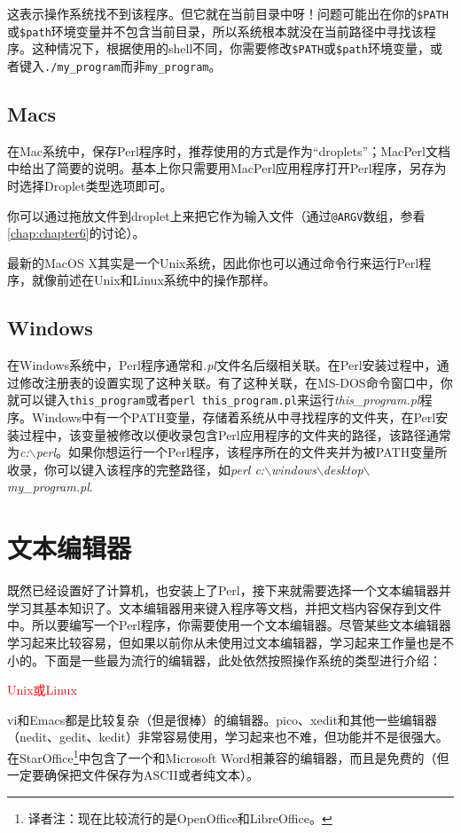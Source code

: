 这表示操作系统找不到该程序。但它就在当前目录中呀！问题可能出在你的\verb|$PATH|或\verb|$path|环境变量并不包含当前目录，所以系统根本就没在当前路径中寻找该程序。这种情况下，根据使用的shell不同，你需要修改\verb|$PATH|或\verb|$path|环境变量，或者键入\verb|./my_program|而非\verb|my_program|。

\subsection{Macs}
在Mac系统中，保存Perl程序时，推荐使用的方式是作为“droplets”；MacPerl文档中给出了简要的说明。基本上你只需要用MacPerl应用程序打开Perl程序，另存为时选择Droplet类型选项即可。

你可以通过拖放文件到droplet上来把它作为输入文件（通过\verb|@ARGV|数组，参看\autoref{chap:chapter6}的讨论）。

最新的MacOS X其实是一个Unix系统，因此你也可以通过命令行来运行Perl程序，就像前述在Unix和Linux系统中的操作那样。

\subsection{Windows}
在Windows系统中，Perl程序通常和\textit{.pl}文件名后缀相关联。在Perl安装过程中，通过修改注册表的设置实现了这种关联。有了这种关联，在MS-DOS命令窗口中，你就可以键入\verb|this_program|或者\verb|perl this_program.pl|来运行\textit{this\_program.pl}程序。Windows中有一个PATH变量，存储着系统从中寻找程序的文件夹，在Perl安装过程中，该变量被修改以便收录包含Perl应用程序的文件夹的路径，该路径通常为\textit{c:$\backslash$perl}。如果你想运行一个Perl程序，该程序所在的文件夹并为被PATH变量所收录，你可以键入该程序的完整路径，如\textit{perl c:$\backslash$windows$\backslash$desktop$\backslash$my\_program.pl}.

\section{文本编辑器}
既然已经设置好了计算机，也安装上了Perl，接下来就需要选择一个文本编辑器并学习其基本知识了。文本编辑器用来键入程序等文档，并把文档内容保存到文件中。所以要编写一个Perl程序，你需要使用一个文本编辑器。尽管某些文本编辑器学习起来比较容易，但如果以前你从未使用过文本编辑器，学习起来工作量也是不小的。下面是一些最为流行的编辑器，此处依然按照操作系统的类型进行介绍：

\noindent
\textcolor{red}{Unix或Linux}
\begin{adjustwidth}{1cm}{}
vi和Emacs都是比较复杂（但是很棒）的编辑器。pico、xedit和其他一些编辑器（nedit、gedit、kedit）非常容易使用，学习起来也不难，但功能并不是很强大。在StarOffice\footnote{译者注：现在比较流行的是OpenOffice和LibreOffice。}中包含了一个和Microsoft Word相兼容的编辑器，而且是免费的（但一定要确保把文件保存为ASCII或者纯文本）。
\end{adjustwidth}

